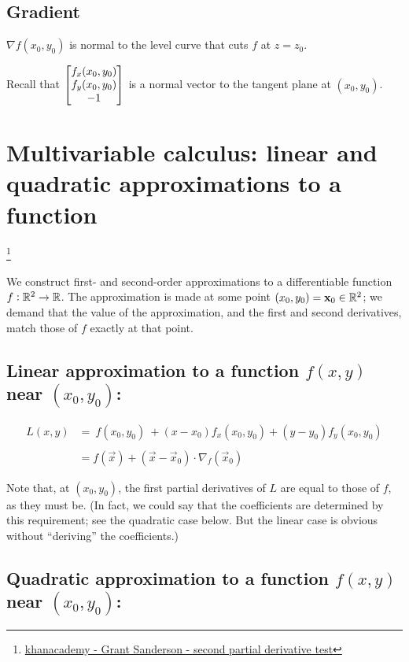 \subsection{Gradient}
$\nabla f(x_0, y_0)$ is normal to the level curve that cuts $f$ at $z = z_0$.

Recall that $\begin{bmatrix}f_x(x_0,y_0)\\f_y(x_0,y_0)\\-1\end{bmatrix}$ is a normal vector to the
tangent plane at $(x_0,y_0)$.


\section{Multivariable calculus: linear and quadratic approximations to a function}
\footnote{
  \href{https://www.khanacademy.org/math/multivariable-calculus/applications-of-multivariable-derivatives/optimizing-multivariable-functions/a/reasoning-behind-the-second-partial-derivative-test}{khanacademy - Grant Sanderson - second partial derivative test}
}


We construct first- and second-order approximations to a differentiable
function $f: \mathbb{R}^2 \rightarrow \mathbb{R}$. The approximation is made at some point
$(x_0, y_0) = \mathbf x_0 \in \mathbb{R}^2$; we demand that the value of the approximation, and the
first and second derivatives, match those of $f$ exactly at that point.

\subsection{Linear approximation to a function $f(x, y)$ near $(x_0, y_0)$:}

\begin{align*}
L(x, y) &=
~
f(x_0, y_0) ~+
(x - x_0)f_x(x_0,y_0) +
(y - y_0)f_y(x_0,y_0)
\\\\
&= f(\vec x) + (\vec x - \vec x_0) \cdot \nabla_f(\vec x_0)
\end{align*}

Note that, at $(x_0, y_0)$, the first partial derivatives of $L$ are equal to
those of $f$, as they must be. (In fact, we could say that the coefficients are
determined by this requirement; see the quadratic case below. But the linear
case is obvious without ``deriving'' the coefficients.)


\subsection{Quadratic approximation to a function $f(x, y)$ near $(x_0, y_0)$:}

